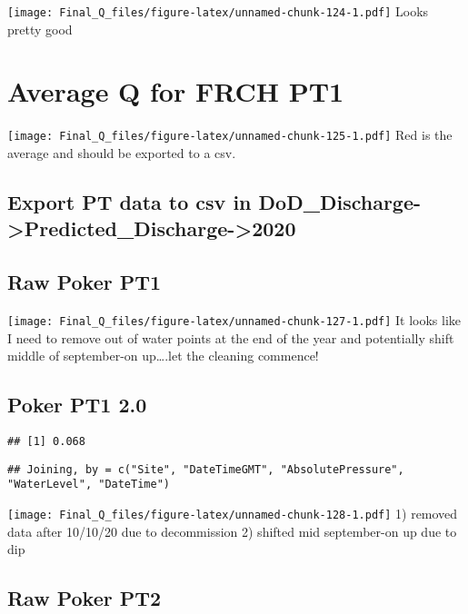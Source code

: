 \documentclass[
]{article}
\begin{document}
\texttt{[image: Final\_Q\_files/figure-latex/unnamed-chunk-124-1.pdf]}
Looks pretty good

\hypertarget{average-q-for-frch-pt1}{%
\section{Average Q for FRCH PT1}\label{average-q-for-frch-pt1}}

\texttt{[image: Final\_Q\_files/figure-latex/unnamed-chunk-125-1.pdf]} Red
is the average and should be exported to a csv.

\hypertarget{export-pt-data-to-csv-in-dod_discharge-predicted_discharge-2020-1}{%
\subsection{Export PT data to csv in
DoD\_Discharge-\textgreater Predicted\_Discharge-\textgreater2020}\label{export-pt-data-to-csv-in-dod_discharge-predicted_discharge-2020-1}}

\hypertarget{raw-poker-pt1-1}{%
\subsection{Raw Poker PT1}\label{raw-poker-pt1-1}}

\texttt{[image: Final\_Q\_files/figure-latex/unnamed-chunk-127-1.pdf]} It
looks like I need to remove out of water points at the end of the year
and potentially shift middle of september-on up\ldots.let the cleaning
commence!

\hypertarget{poker-pt1-2.0}{%
\subsection{Poker PT1 2.0}\label{poker-pt1-2.0}}

\begin{verbatim}
## [1] 0.068
\end{verbatim}

\begin{verbatim}
## Joining, by = c("Site", "DateTimeGMT", "AbsolutePressure", "WaterLevel", "DateTime")
\end{verbatim}

\texttt{[image: Final\_Q\_files/figure-latex/unnamed-chunk-128-1.pdf]} 1)
removed data after 10/10/20 due to decommission 2) shifted mid
september-on up due to dip

\hypertarget{raw-poker-pt2-1}{%
\subsection{Raw Poker PT2}\label{raw-poker-pt2-1}}
\end{document}
